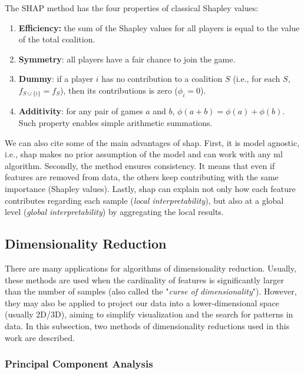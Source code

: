 The SHAP method has the four properties of classical Shapley values:

\begin{enumerate}
\item \textbf{Efficiency:} the sum of the Shapley values for all players is equal to the value of the total coalition. 
\item \textbf{Symmetry}: all players have a fair chance to join the game.
\item \textbf{Dummy}: if a player $i$ has no contribution to a coalition $S$ (i.e., for each $S$, $f_{S \cup \{i\}} = f_S$), then its contributions is zero ($\phi_i = 0$).
\item \textbf{Additivity}: for any pair of games $a$ and $b$, $\phi(a + b) = \phi(a) + \phi(b)$. Such property enables simple arithmetic summations.
\end{enumerate}

We can also cite some of the main advantages of \acs{shap}. First, it is model agnostic, i.e., \acs{shap} makes no prior assumption of the model and can work with any \acs{ml} algorithm. Secondly, the method ensures consistency. It means that even if features are removed from data, the others keep contributing with the same importance (Shapley values). Lastly, \acs{shap} can explain not only how each feature contributes regarding each sample (\textit{local interpretability}), but also at a global level (\textit{global interpretability}) by aggregating the local results.

\subsection{Dimensionality Reduction}

There are many applications for algorithms of dimensionality reduction. Usually, these methods are used when the cardinality of features is significantly larger than the number of samples (also called the "\textit{curse of dimensionality}"). However, they may also be applied to project our data into a lower-dimensional space (usually 2D/3D), aiming to simplify visualization and the search for patterns in data. In this subsection, two methods of dimensionality reductions used in this work are described.

\subsubsection{Principal Component Analysis}
\label{sec:pca}

